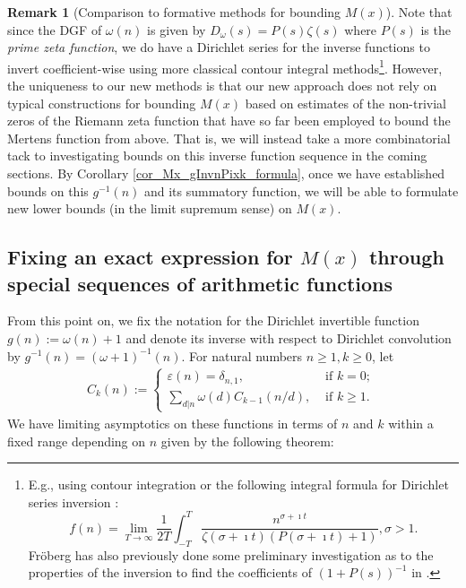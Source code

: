 \documentclass[11pt,reqno,a4letter]{article}
\numberwithin{figure}{section}
\numberwithin{table}{section}
\theoremstyle{plain}
\numberwithin{theorem}{section}
\theoremstyle{definition}
\newtheorem{remark}[theorem]{Remark}
\begin{document}
\begin{remark}[Comparison to formative methods for bounding $M(x)$]
Note that since the DGF of $\omega(n)$ is given by 
$D_{\omega}(s) = P(s) \zeta(s)$ where $P(s)$ is the \emph{prime zeta function}, we do have a 
Dirichlet series for the inverse functions to invert coefficient-wise using more classical 
contour integral methods\footnote{
E.g., using contour integration or the following integral formula for Dirichlet series 
inversion \cite[\S 11]{APOSTOLANUMT}: 
\[
f(n) = \lim_{T \rightarrow \infty} \frac{1}{2T} \int_{-T}^{T} 
     \frac{n^{\sigma+\imath t}}{\zeta(\sigma+\imath t)(P(\sigma+\imath t) + 1)}, \sigma > 1. 
\]
Fr\"oberg has also previously done some preliminary investigation as to the properties of the 
inversion to find the coefficients of $(1+P(s))^{-1}$ in \cite{FROBERG-1968}. 
}. 
However, the uniqueness to our new methods is that our new approach does not rely on typical constructions for 
bounding $M(x)$ based on estimates of the non-trivial zeros of the Riemann zeta function that have so far 
been employed to bound the Mertens function from above. 
That is, we will instead take a more combinatorial tack to investigating bounds on this inverse function 
sequence in the coming sections. By Corollary \ref{cor_Mx_gInvnPixk_formula}, 
once we have established bounds on this $g^{-1}(n)$ and its summatory function, we will be able to 
formulate new lower bounds (in the limit supremum sense) on $M(x)$. 
\end{remark} 

\subsection{Fixing an exact expression for $M(x)$ through special sequences of arithmetic functions} 

From this point on, we fix the notation for the Dirichlet invertible function $g(n) := \omega(n) + 1$ and denote its 
inverse with respect to Dirichlet convolution by $g^{-1}(n) = (\omega+1)^{-1}(n)$. 
For natural numbers $n \geq 1, k \geq 0$, let 
\begin{align*} 
C_k(n) := \begin{cases} 
     \varepsilon(n) = \delta_{n,1}, & \text{ if $k = 0$; } \\ 
     \sum\limits_{d|n} \omega(d) C_{k-1}(n/d), & \text{ if $k \geq 1$. } 
     \end{cases} 
\end{align*} 
We have limiting asymptotics on these functions in terms of $n$ and $k$ within a fixed range 
depending on $n$ given by the following theorem: 
\end{document}
